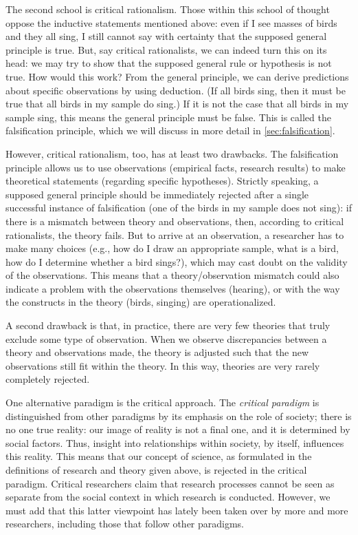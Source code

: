 \documentclass[
]{book}
\begin{document}
The second school is critical rationalism. Those within this school of thought oppose the inductive statements mentioned above: even if I see masses of birds and they all sing, I still cannot say with certainty that the supposed general principle is true. But, say critical rationalists, we can indeed turn this on its head: we may try to show that the supposed general rule or hypothesis is not true. How would this work? From the general principle, we can derive predictions about specific observations by using deduction. (If all birds sing, then it must be true that all birds in my sample do sing.) If it is not the case that all birds in my sample sing, this means the general principle must be false. This is called the falsification principle, which we will discuss in more detail in \ref{sec:falsification}.

However, critical rationalism, too, has at least two drawbacks. The falsification principle allows us to use observations (empirical facts, research results) to make theoretical statements (regarding specific hypotheses). Strictly speaking, a supposed general principle should be immediately rejected after a single successful instance of falsification (one of the birds in my sample does not sing): if there is a mismatch between theory and observations, then, according to critical rationalists, the theory fails. But to arrive at an observation, a researcher has to make many choices (e.g., how do I draw an appropriate sample, what is a bird, how do I determine whether a bird sings?), which may cast doubt on the validity of the observations. This means that a theory/observation mismatch could also indicate a problem with the observations themselves (hearing), or with the way the constructs in the theory (birds, singing) are operationalized.

A second drawback is that, in practice, there are very few theories that truly exclude some type of observation. When we observe discrepancies between a theory and observations made, the theory is adjusted such that the new observations still fit within the theory. In this way, theories are very rarely completely rejected.

One alternative paradigm is the critical approach. The \emph{critical paradigm} is distinguished from other paradigms by its emphasis on the role of society; there is no one true reality: our image of reality is not a final one, and it is determined by social factors. Thus, insight into relationships within society, by itself, influences this reality. This means that our concept of science, as formulated in the definitions of research and theory given above, is rejected in the critical paradigm. Critical researchers claim that research processes cannot be seen as separate from the social context in which research is conducted. However, we must add that this latter viewpoint has lately been taken over by more and more researchers, including those that follow other paradigms.
\end{document}
